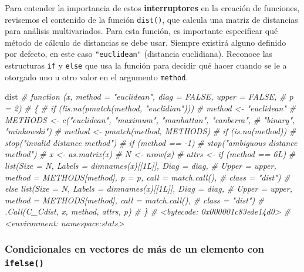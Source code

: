 \documentclass[
]{article}
\newenvironment{Shaded}{\begin{snugshade}}{\end{snugshade}}
\newcommand{\CommentTok}[1]{\textcolor[rgb]{0.56,0.35,0.01}{\textit{#1}}}
\newcommand{\NormalTok}[1]{#1}
\theoremstyle{definition}
\theoremstyle{definition}
\theoremstyle{definition}
\theoremstyle{definition}
\theoremstyle{remark}
\begin{document}
Para entender la importancia de estos \textbf{interruptores} en la creación de funciones, revisemos el contenido de la función \texttt{dist()}, que calcula una matriz de distancias para análisis multivariados. Para esta función, es importante especificar qué método de cálculo de distancias se debe usar. Siempre existirá alguno definido por defecto, en este caso \texttt{"euclidean"} (distancia euclidiana). Reconoce las estructuras \texttt{if} y \texttt{else} que usa la función para decidir qué hacer cuando se le a otorgado uno u otro valor en el argumento \texttt{method}.

\begin{Shaded}
\begin{Highlighting}[]
\NormalTok{dist}
\CommentTok{\# function (x, method = "euclidean", diag = FALSE, upper = FALSE, }
\CommentTok{\#     p = 2) }
\CommentTok{\# \{}
\CommentTok{\#     if (!is.na(pmatch(method, "euclidian"))) }
\CommentTok{\#         method \textless{}{-} "euclidean"}
\CommentTok{\#     METHODS \textless{}{-} c("euclidean", "maximum", "manhattan", "canberra", }
\CommentTok{\#         "binary", "minkowski")}
\CommentTok{\#     method \textless{}{-} pmatch(method, METHODS)}
\CommentTok{\#     if (is.na(method)) }
\CommentTok{\#         stop("invalid distance method")}
\CommentTok{\#     if (method == {-}1) }
\CommentTok{\#         stop("ambiguous distance method")}
\CommentTok{\#     x \textless{}{-} as.matrix(x)}
\CommentTok{\#     N \textless{}{-} nrow(x)}
\CommentTok{\#     attrs \textless{}{-} if (method == 6L) }
\CommentTok{\#         list(Size = N, Labels = dimnames(x)[[1L]], Diag = diag, }
\CommentTok{\#             Upper = upper, method = METHODS[method], p = p, call = match.call(), }
\CommentTok{\#             class = "dist")}
\CommentTok{\#     else list(Size = N, Labels = dimnames(x)[[1L]], Diag = diag, }
\CommentTok{\#         Upper = upper, method = METHODS[method], call = match.call(), }
\CommentTok{\#         class = "dist")}
\CommentTok{\#     .Call(C\_Cdist, x, method, attrs, p)}
\CommentTok{\# \}}
\CommentTok{\# \textless{}bytecode: 0x000001c83ede14d0\textgreater{}}
\CommentTok{\# \textless{}environment: namespace:stats\textgreater{}}
\end{Highlighting}
\end{Shaded}

\hypertarget{condicionales-en-vectores-de-muxe1s-de-un-elemento-con-ifelse}{%
\subsubsection{\texorpdfstring{Condicionales en vectores de más de un elemento con \texttt{ifelse()}}{Condicionales en vectores de más de un elemento con ifelse()}}\label{condicionales-en-vectores-de-muxe1s-de-un-elemento-con-ifelse}}
\end{document}
